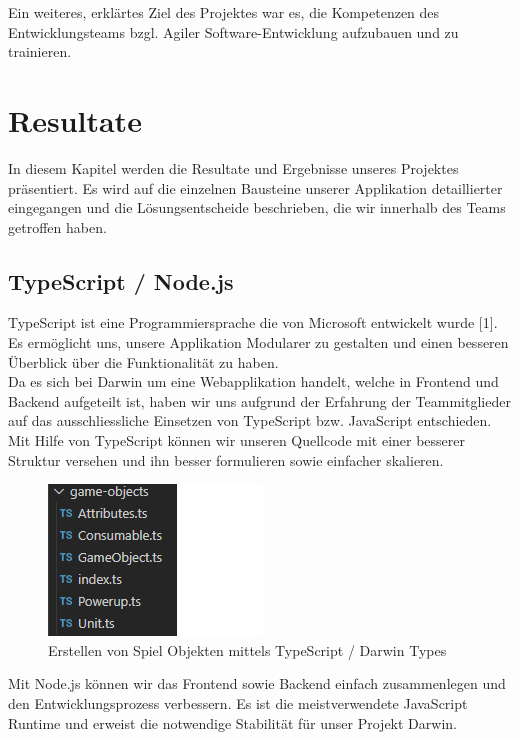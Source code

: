\documentclass[11pt,a4paper,titlepage]{article}
\begin{document}
Ein weiteres, erklärtes Ziel des Projektes war es, die Kompetenzen des Entwicklungsteams bzgl. Agiler Software-Entwicklung aufzubauen und zu trainieren.

\newpage

\section{Resultate}
In diesem Kapitel werden die Resultate und Ergebnisse unseres Projektes präsentiert.
Es wird auf die einzelnen Bausteine unserer Applikation detaillierter eingegangen und die Lösungsentscheide beschrieben, die wir innerhalb des Teams getroffen haben.

\subsection{TypeScript / Node.js}
TypeScript ist eine Programmiersprache die von Microsoft entwickelt wurde [1]. Es ermöglicht uns, unsere Applikation Modularer zu gestalten und einen besseren Überblick über die Funktionalität zu haben.\\
Da es sich bei Darwin um eine Webapplikation handelt, welche in Frontend und Backend aufgeteilt ist, haben wir uns aufgrund der Erfahrung der Teammitglieder auf das ausschliessliche Einsetzen von TypeScript bzw. JavaScript entschieden.
Mit Hilfe von TypeScript können wir unseren Quellcode mit einer besserer Struktur versehen und ihn besser formulieren sowie einfacher skalieren.

\begin{figure}[H]
	\includegraphics{darwintypes.png}
	\caption{Erstellen von Spiel Objekten mittels TypeScript / Darwin Types}
\end{figure}

Mit Node.js können wir das Frontend sowie Backend einfach zusammenlegen und den Entwicklungsprozess verbessern. Es ist die meistverwendete JavaScript Runtime und erweist die notwendige Stabilität für unser Projekt Darwin.
\end{document}
